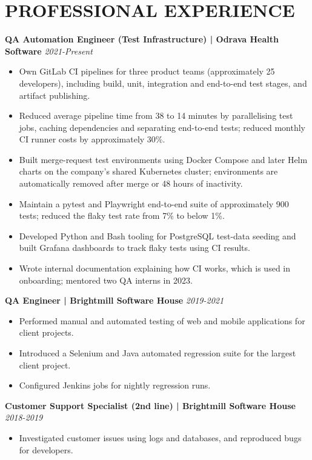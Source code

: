 \documentclass[11pt,a4paper]{article}
\begin{document}
\section*{PROFESSIONAL EXPERIENCE}
\textbf{QA Automation Engineer (Test Infrastructure) | Odrava Health Software} \hfill \textit{2021-Present}
\begin{itemize}
\item Own GitLab CI pipelines for three product teams (approximately 25 developers), including build, unit, integration and end-to-end test stages, and artifact publishing.
\item Reduced average pipeline time from 38 to 14 minutes by parallelising test jobs, caching dependencies and separating end-to-end tests; reduced monthly CI runner costs by approximately 30\%.
\item Built merge-request test environments using Docker Compose and later Helm charts on the company's shared Kubernetes cluster; environments are automatically removed after merge or 48 hours of inactivity.
\item Maintain a pytest and Playwright end-to-end suite of approximately 900 tests; reduced the flaky test rate from 7\% to below 1\%.
\item Developed Python and Bash tooling for PostgreSQL test-data seeding and built Grafana dashboards to track flaky tests using CI results.
\item Wrote internal documentation explaining how CI works, which is used in onboarding; mentored two QA interns in 2023.
\end{itemize}

\textbf{QA Engineer | Brightmill Software House} \hfill \textit{2019-2021}
\begin{itemize}
\item Performed manual and automated testing of web and mobile applications for client projects.
\item Introduced a Selenium and Java automated regression suite for the largest client project.
\item Configured Jenkins jobs for nightly regression runs.
\end{itemize}

\textbf{Customer Support Specialist (2nd line) | Brightmill Software House} \hfill \textit{2018-2019}
\begin{itemize}
\item Investigated customer issues using logs and databases, and reproduced bugs for developers.
\end{itemize}
\end{document}

